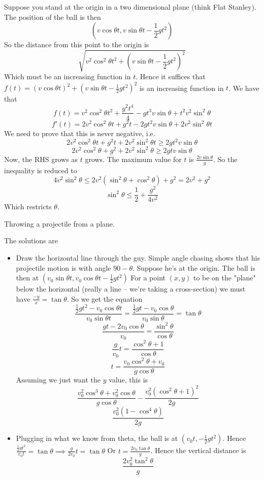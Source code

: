 \documentclass[11pt]{scrartcl}
\begin{document}
\begin{soln}
  Suppose you stand at the origin in a two dimensional plane (think Flat Stanley). The position of the ball is then
  $$(v\cos\theta t, v\sin\theta t-\frac{1}{2}gt^2)$$
  So the distance from this point to the origin is
  $$\sqrt{v^2\cos^2\theta t^2+(v\sin\theta t-\frac{1}{2}gt^2)^2}$$
  Which must be an increasing function in $t$.
  Hence it suffices that $f(t)=(v\cos\theta t)^2+(v\sin\theta t-\frac{1}{2}gt^2)^2$
  is an increasing function in $t$. We have that
  $$f(t)=v^2\cos^2\theta t^2+\frac{g^2t^4}{4}-gt^3v\sin\theta+t^2v^2\sin^2\theta$$
  $$f'(t)=2v^2\cos^2\theta t+g^2t-2gt^2v\sin\theta+2v^2\sin^2\theta t$$
  We need to prove that this is never negative, i.e.
  $$2v^2\cos^2\theta t+g^2t+2v^2\sin^2\theta t\ge 2gt^2v\sin\theta$$
  $$2v^2\cos^2\theta+g^2+2v^2\sin^2\theta\ge 2gtv\sin\theta$$
  Now, the RHS grows as $t$ grows. The maximum value for $t$ is $\frac{2v\sin\theta}{g}$.
  So the inequality is reduced to
  $$4v^2\sin^2\theta\le 2v^2(\sin^2\theta+\cos^2\theta)+g^2=2v^2+g^2$$
  $$\sin^2\theta \le \frac{1}{2}+\frac{g^2}{4v^2}$$
  Which restricts $\theta$.
\end{soln}
\begin{example}
  [3.49]
  Throwing a projectile from a plane.
\end{example}
\begin{soln}
  The solutions are
  \begin{itemize}
    \item Draw the horizontal line through the guy. Simple angle chasing shows
      that his projectile motion is with angle $90-\theta$. Suppose he's at
      the origin. The ball is then at $(v_0\sin\theta t,v_0\cos\theta t-\frac{1}{2}gt^2)$
      For a point $(x,y)$ to be on the "plane" below the horizontal (really a line -- we're taking a cross-section)
      we must have $\frac{-y}{x}=\tan\theta$. So we get the equation
      $$\frac{\frac{1}{2}gt^2-v_0\cos\theta t}{v_0\sin\theta t}=\frac{\frac{1}{2}gt-v_0\cos\theta}{v_0\sin\theta}=\tan\theta$$
      $$\frac{gt-2v_0\cos\theta}{v_0}=\frac{\sin^2\theta}{\cos\theta}$$
      $$\frac{g}{v_0}t=\frac{\cos^2\theta + 1}{\cos\theta}$$
      $$t=\frac{v_0\cos^2\theta+v_0}{g\cos\theta}$$
      Assuming we just want the $y$ value, this is
      $$\frac{v_0^2\cos^3\theta+v_0^2\cos\theta}{g\cos\theta}-\frac{v_0^2(\cos^2\theta+1)^2}{2g}$$
      $$\frac{v_0^2(1-\cos^4\theta)}{2g}$$
    \item Plugging in what we know from theta, the ball is at $(v_0t, -\frac{1}{2}gt^2)$.
      Hence $\frac{\frac{1}{2}gt^2}{v_0t}=\tan\theta\implies \frac{g}{2v_0}t=\tan\theta$
      Or $t=\frac{2v_0\tan\theta}{g}$. Hence the vertical distance is
      $$\frac{2v_0^2\tan^2\theta}{g}$$
  \end{itemize}
\end{soln}
\end{document}
